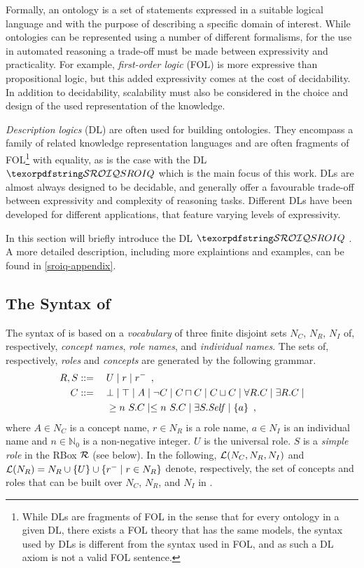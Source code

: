Formally, an ontology is a set of statements expressed in a suitable logical language and with the purpose of describing a specific domain of interest. While ontologies can be represented using a number of different formalisms, for the use in automated reasoning a trade-off must be made between expressivity and practicality. For example, \emph{first-order logic} (FOL) is more expressive than propositional logic, but this added expressivity comes at the cost of decidability. In addition to decidability, scalability must also be considered in the choice and design of the used representation of the knowledge.

\emph{Description logics} (DL) are often used for building ontologies. They encompass a family of related knowledge representation languages and are often fragments of FOL\footnote{While DLs are fragments of FOL in the sense that for every ontology in a given DL, there exists a FOL theory that has the same models, the syntax used by DLs is different from the syntax used in FOL, and as such a DL axiom is not a valid FOL sentence.} with equality, as is the case with the DL $\SROIQ$ which is the main focus of this work. DLs are almost always designed to be decidable, and generally offer a favourable trade-off between expressivity and complexity of reasoning tasks. Different DLs have been developed for different applications, that feature varying levels of expressivity.

In this section will briefly introduce the DL $\SROIQ$ \cite{horrocks2006even, rudolph2011foundations, baader_horrocks_lutz_sattler_2017}. A more detailed description, including more explaintions and examples, can be found in \cref{sroiq-appendix}.

\subsection{The Syntax of \SROIQ} \label{sroiq-syntax}

The syntax of \SROIQ is based on a \emph{vocabulary} of three finite disjoint sets $N_C$, $N_R$, $N_I$ of, respectively, \emph{concept names}, \emph{role names}, and \emph{individual names}. The sets of, respectively, \SROIQ  \emph{roles} and \SROIQ \emph{concepts} are generated by the following grammar.
\begin{alignat*}{2}
  R, S &::={} && U \mid r \mid r^{-} \enspace,\\
  C &::= && \bot \mid \top \mid A \mid \neg C \mid C \sqcap C \mid C \sqcup C \mid \forall R.C \mid \exists R.C \mid \\ 
  &&& \geq n~S.C \mid \leq n~S.C \mid \exists S.\mathit{Self} \mid \{a\} \enspace,
\end{alignat*}
where $A \in N_C$ is a concept name, $r \in N_R$ is a role name, $a \in N_I$ is an individual name and $n \in \mathbb{N}_0$ is a non-negative integer. 
%
$U$ is the universal role. $S$ is a \emph{simple role} in the RBox $\mathcal{R}$ (see below). In the following, $\mathcal{L}(N_C, N_R, N_I)$ and $\mathcal{L}(N_R) = N_R \cup \{U\} \cup \{r^- \mid r \in N_R\}$ denote, respectively, the set of concepts and roles that can be built over $N_C$, $N_R$, and $N_I$ in \SROIQ.

